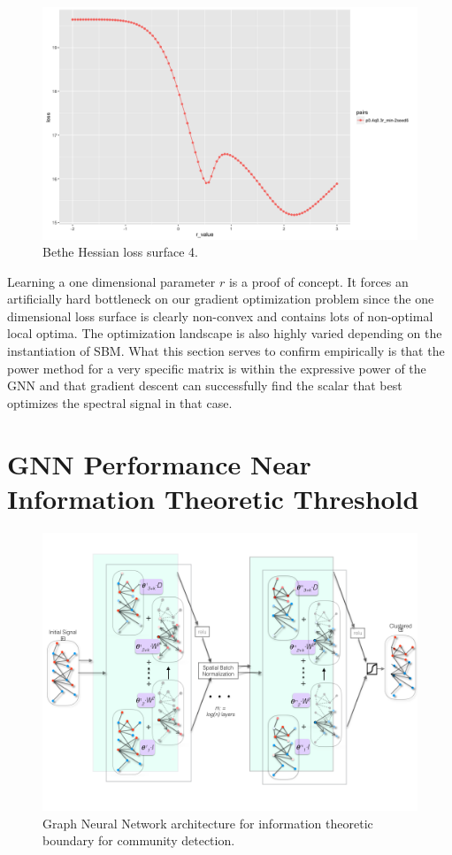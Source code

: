 \begin{figure}[H]
\begin{center}
\includegraphics[scale=0.4]{loss_surface_4.png}
\caption{Bethe Hessian loss surface 4.}
 \end{center}
\end{figure}
 
Learning a one dimensional parameter $r$ is a proof of concept.  It forces an artificially hard bottleneck on our gradient optimization problem since the one dimensional loss surface is clearly non-convex and contains lots of non-optimal local optima. The optimization landscape is also highly varied depending on the instantiation of SBM.  What this section serves to confirm empirically is that the power method for a very specific matrix is within the expressive power of the GNN and that gradient descent can successfully find the scalar that best optimizes the spectral signal in that case. 

\newpage

\section{GNN Performance Near Information Theoretic Threshold}
\begin{figure}[H]
\begin{center}
  \includegraphics[scale=0.45]{GNN_diagram_2.png}
  \caption{Graph Neural Network architecture for information theoretic boundary for community detection.}
  \label{fig:GNN}
\end{center}
\end{figure}

